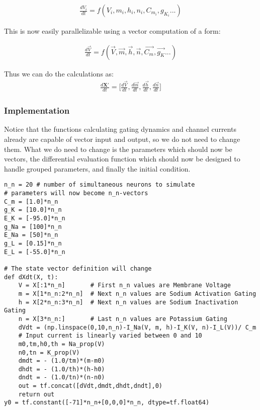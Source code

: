 \documentclass[10pt,letterpaper]{article}
\begin{document}
\begin{eqnarray}\frac{dV_i}{dt}=f(V_i,m_i,h_i,n_i,C_{m_i},g_{K_i}...)\end{eqnarray}

This is now easily parallelizable using a vector computation of a form: 

\begin{eqnarray}\frac{d\vec{V}}{dt}=f(\vec{V},\vec{m},\vec{h},\vec{n},\vec{C_m},\vec{g_K}...)\end{eqnarray}

Thus we can do the calculations as:
\begin{eqnarray}\frac{d\mathbf{X'}}{dt}= \Big[\frac{d\vec{V}}{dt},\frac{d\vec{m}}{dt},\frac{d\vec{h}}{dt},\frac{d\vec{n}}{dt}\Big]\end{eqnarray}

\subsubsection*{Implementation}

Notice that the functions calculating gating dynamics and channel currents already are capable of vector input and output, so we do not need to change them. What we do need to change is the parameters which should now be vectors, the differential evaluation  function which should now be designed to handle grouped parameters, and finally the initial condition.

\begin{verbatim}
n_n = 20 # number of simultaneous neurons to simulate
# parameters will now become n_n-vectors
C_m = [1.0]*n_n
g_K = [10.0]*n_n
E_K = [-95.0]*n_n
g_Na = [100]*n_n
E_Na = [50]*n_n 
g_L = [0.15]*n_n
E_L = [-55.0]*n_n

# The state vector definition will change
def dXdt(X, t):
    V = X[:1*n_n]       # First n_n values are Membrane Voltage
    m = X[1*n_n:2*n_n]  # Next n_n values are Sodium Activation Gating
    h = X[2*n_n:3*n_n]  # Next n_n values are Sodium Inactivation Gating
    n = X[3*n_n:]       # Last n_n values are Potassium Gating
    dVdt = (np.linspace(0,10,n_n)-I_Na(V, m, h)-I_K(V, n)-I_L(V))/ C_m 
    # Input current is linearly varied between 0 and 10
    m0,tm,h0,th = Na_prop(V)
    n0,tn = K_prop(V)
    dmdt = - (1.0/tm)*(m-m0)
    dhdt = - (1.0/th)*(h-h0)
    dndt = - (1.0/tn)*(n-n0)
    out = tf.concat([dVdt,dmdt,dhdt,dndt],0)
    return out
y0 = tf.constant([-71]*n_n+[0,0,0]*n_n, dtype=tf.float64)
\end{verbatim}
\end{document}

